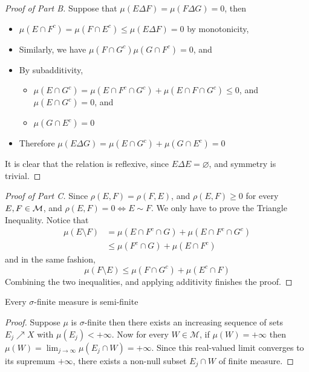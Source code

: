 \documentclass[../../main.tex]{subfiles}
\begin{document}
\begin{proof}[Proof of Part B]
    Suppose that $\mu(E\Delta F)=\mu(F\Delta G)=0$, then
    \begin{itemize}
        \item $\mu(E\cap F^c)=\mu(F\cap E^c)\leq \mu(E\Delta F)=0$ by monotonicity,
        \item Similarly, we have $\mu(F\cap G^c)\mu(G\cap F^c)=0$, and
        \item By subadditivity, 
        \begin{itemize}
            \item $\mu(E\cap G^c)=\mu(E\cap F^c\cap G^c) + \mu(E\cap F\cap G^c)\leq 0$, and $\mu(E\cap G^c)=0$, and
            \item $\mu(G\cap E^c)=0$
        \end{itemize}
        \item Therefore $\mu(E\Delta G)=\mu(E\cap G^c) + \mu(G\cap E^c)=0$
    \end{itemize}
    It is clear that the relation is reflexive, since $E\Delta E =\varnothing$, and symmetry is trivial.
\end{proof}
\begin{proof}[Proof of Part C]
    Since $\rho(E,F)=\rho(F,E)$, and $\rho(E,F)\geq 0$ for every $E,F\in\mathcal{M}$, and $\rho(E,F)=0\iff E\sim F$. We only have to prove the Triangle Inequality. Notice that
    \begin{align*}
    \mu(E\setminus F) &= \mu(E\cap F^c\cap G) + \mu(E\cap F^c\cap G^c)\\
    &\leq \mu(F^c\cap G) + \mu(E\cap F^c)
    \end{align*}
    and in the same fashion,
    \[
    \mu(F\setminus E) \leq \mu(F\cap G^c) + \mu(E^c\cap F)
    \]
    Combining the two inequalities, and applying additivity finishes the proof.
\end{proof}

\newpage{}
\begin{wts}
Every $\sigma$-finite measure is semi-finite
\end{wts}
\begin{proof}
    Suppose $\mu$ is $\sigma$-finite then there exists an increasing sequence of sets $E_j\nearrow X$ with $\mu(E_j)<+\infty$. Now for every $W\in\mathcal{M}$, if $\mu(W)=+\infty$ then $\mu(W)=\lim_{j\to\infty}\mu(E_j\cap W)=+\infty$. Since this real-valued limit converges to its supremum $+\infty$, there exists a non-null subset $E_j\cap W$ of finite measure.
\end{proof}
\end{document}
